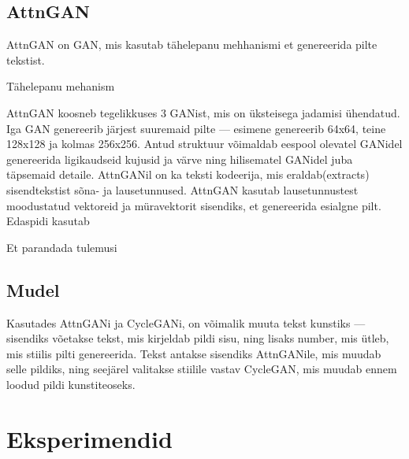 \documentclass{vilgym}
\begin{document}
	\subsection{AttnGAN}
	AttnGAN on GAN, mis kasutab tähelepanu mehhanismi et genereerida pilte tekstist.
	
	Tähelepanu mehanism
	
	AttnGAN koosneb tegelikkuses 3 GANist, mis on üksteisega jadamisi ühendatud. Iga GAN genereerib järjest suuremaid pilte --- esimene genereerib 64x64, teine 128x128 ja kolmas 256x256. Antud struktuur võimaldab eespool olevatel GANidel genereerida ligikaudseid kujusid ja värve ning hilisematel GANidel juba täpsemaid detaile.
	AttnGANil on ka teksti kodeerija, mis eraldab(extracts) sisendtekstist sõna- ja lausetunnused. AttnGAN kasutab lausetunnustest moodustatud vektoreid ja müravektorit sisendiks, et genereerida esialgne pilt. Edaspidi kasutab
	
	Et parandada tulemusi

	\subsection{Mudel}
	Kasutades AttnGANi ja CycleGANi, on võimalik muuta tekst kunstiks --- sisendiks võetakse tekst, mis kirjeldab pildi sisu, ning lisaks number, mis ütleb, mis stiilis pilti genereerida. Tekst antakse sisendiks AttnGANile, mis muudab selle pildiks, ning seejärel valitakse stiilile vastav CycleGAN, mis muudab ennem loodud pildi kunstiteoseks.


	\section{Eksperimendid}


	\nocite{*} %
	\printbibliography[title={Kasutatud allikad}]
\end{document}
